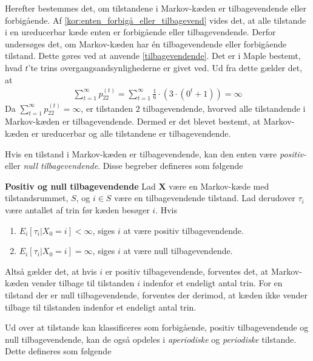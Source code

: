 \begin{eks}
Herefter bestemmes det, om tilstandene i Markov-kæden er tilbagevendende eller forbigående. Af \autoref{kor:enten_forbigå_eller_tilbagevend} vides det, at alle tilstande i en ureducerbar kæde enten er forbigående eller tilbagevendende. Derfor undersøges det, om Markov-kæden har én tilbagevendende eller forbigående tilstand. Dette gøres ved at anvende \autoref{tilbagevendende}. Det er i Maple bestemt, hvad $t$'te trins overgangsandsynlighederne er givet ved. Ud fra dette gælder det, at
\begin{align*}
    \sum_{t=1}^\infty p_{22}^{(t)} = \sum_{t=1}^\infty \frac{1}{6} \cdot \left(3 \cdot (0^t +1)\right) = \infty
\end{align*}
Da $\displaystyle\sum_{t=1}^\infty p_{22}^{(t)}=\infty$, er tilstanden $2$ tilbagevendende, hvorved alle tilstandende i Markov-kæden er tilbagevendende. 
Dermed er det blevet bestemt, at Markov-kæden er ureducerbar og alle tilstandene er tilbagevendende.
\end{eks}

Hvis en tilstand i Markov-kæden er tilbagevendende, kan den enten være \textit{positiv-} eller \textit{null tilbagevendende}. Disse begreber defineres som følgende

\begin{defn}\textbf{Positiv og null tilbagevendende}\label{def:positiv_null_tilbagevendende} %
\newline
Lad $\bm X$ være en Markov-kæde med tilstandsrummet, $S$, og $i\in S$ være en tilbagevendende tilstand.  Lad derudover  $\tau_i$ være antallet af trin før kæden besøger $i$. Hvis
\begin{enumerate}
    \item $E_i[\tau_i|X_0 = i]<\infty$, siges $i$ at være positiv tilbagevendende.
    \item $E_i[\tau_i|X_0 = i]=\infty$, siges $i$ at være null tilbagevendende.
\end{enumerate}
\end{defn}

Altså gælder det, at hvis $i$ er positiv tilbagevendende, forventes det, at Markov-kæden vender tilbage til tilstanden $i$ indenfor et endeligt antal trin. For en tilstand der er null tilbagevendende, forventes der derimod, at kæden ikke vender tilbage til tilstanden indenfor et endeligt antal trin. %

Ud over at tilstande kan klassificeres som forbigående, positiv tilbagevendende og null tilbagevendende, kan de også opdeles i \textit{aperiodiske} og \textit{periodiske} tilstande. Dette defineres som følgende

